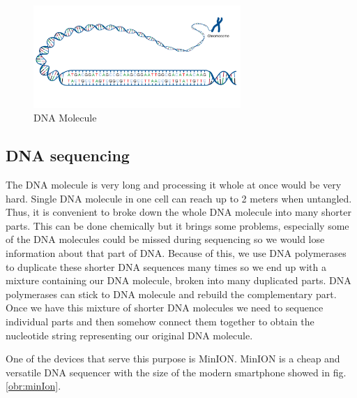 
\begin{figure}
\centerline{\includegraphics[width=0.7\textwidth, height=0.3\textheight]{images/acgt}}
\caption[DNA]{DNA Molecule}
\label{obr:acgt}
\end{figure}

\subsection{DNA sequencing}

The DNA molecule is very long and processing it whole at once would be very hard. Single
DNA molecule in one cell can reach up to 2 meters when untangled.
Thus, it is convenient to broke down the whole DNA molecule into many shorter parts.
This can be done chemically but it brings some problems, especially some of the
DNA molecules could be missed during sequencing so we would lose information about
that part of DNA. Because of this, we use DNA polymerases to duplicate these shorter DNA sequences
many times so we end up with a mixture containing our DNA molecule, broken into
many duplicated parts. DNA polymerases can stick to DNA molecule and rebuild the complementary
part. Once we have this mixture of shorter DNA molecules we need to sequence individual
parts and then somehow connect them together to obtain the nucleotide string representing
our original DNA molecule.

One of the devices that serve this purpose is MinION\cite{lu2016oxford}. MinION is
a cheap and versatile DNA sequencer with the size of the modern smartphone showed in fig.
\ref{obr:minIon}.

